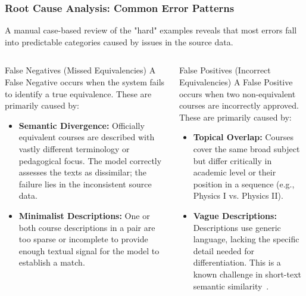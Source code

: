 \documentclass[aspectratio=169,10pt]{beamer}
\begin{document}
\begin{frame}
    \frametitle{Root Cause Analysis: Common Error Patterns}
    
    A manual case-based review of the "hard" examples reveals that most errors fall into predictable categories caused by issues in the source data.
    
    \fontsize{9}{9}\selectfont
    \begin{columns}[T]
        \begin{column}{0.475\textwidth}
            \begin{block}{False Negatives (Missed Equivalencies)}
                A False Negative occurs when the system fails to identify a true equivalence. These are primarily caused by:
                \begin{itemize}
                    \item \textbf{Semantic Divergence:} Officially equivalent courses are described with vastly different terminology or pedagogical focus. The model correctly assesses the texts as dissimilar; the failure lies in the inconsistent source data.
                    
                    \item \textbf{Minimalist Descriptions:} One or both course descriptions in a pair are too sparse or incomplete to provide enough textual signal for the model to establish a match.
                \end{itemize}
            \end{block}
        \end{column}
        
        \begin{column}{0.475\textwidth}
            \begin{block}{False Positives (Incorrect Equivalencies)}
                A False Positive occurs when two non-equivalent courses are incorrectly approved. These are primarily caused by:
                \begin{itemize}
                    \item \textbf{Topical Overlap:} Courses cover the same broad subject but differ critically in academic level or their position in a sequence (e.g., Physics I vs. Physics II).
                    
                    \item \textbf{Vague Descriptions:} Descriptions use generic language, lacking the specific detail needed for differentiation. This is a known challenge in short-text semantic similarity~\cite{app13063911}.
                \end{itemize}
            \end{block}
        \end{column}
    \end{columns}
    

\end{frame}
\end{document}
